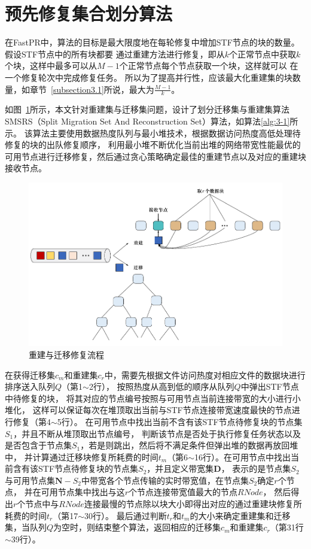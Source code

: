 \section{预先修复集合划分算法}
在FastPR\cite{shen2019fast}中，算法的目标是最大限度地在每轮修复中增加STF节点的块的数量。假设STF节点中的所有块都要
通过重建方法进行修复，即从$k$个正常节点中获取$k$个块，这样中最多可以从$M-1$个正常节点每个节点获取一个块，这样就可以
在一个修复轮次中完成修复任务。
所以为了提高并行性，应该最大化重建集的块数量，如章节~\ref{subsection3.1}所说，最大为$\frac{M-1}{k}$。

如图~\ref{fig:3.3}所示，本文针对重建集与迁移集问题，设计了划分迁移集与重建集算法SMSRS（Split Migration Set And Reconstruction Set）算法，如算法\ref{alg:3-1}所示。
该算法主要使用数据热度队列与最小堆技术，根据数据访问热度高低处理待修复的块的出队修复顺序，
利用最小堆不断优化当前出堆的网络带宽性能最优的可用节点进行迁移修复，然后通过贪心策略确定最佳的重建节点以及对应的重建块接收节点。

\begin{figure}[htbp]
	\centering
	\includegraphics [scale=0.9]{figures/3.3.pdf}
	\caption{重建与迁移修复流程}
	\label{fig:3.3}
\end{figure}

在获得迁移集$c_m$和重建集$c_r$中，需要先根据文件访问热度对相应文件的数据块进行排序送入队列$Q$（第1$\sim$2行），
按照热度从高到低的顺序从队列$Q$中弹出STF节点中待修复的块，
将其对应的节点编号按照与可用节点当前连接带宽的大小进行小堆化，
这样可以保证每次在堆顶取出当前与STF节点连接带宽速度最快的节点进行修复（第4$\sim$5行）。
在可用节点中找出当前不含有该STF节点待修复块的节点集$S_1$，并且不断从堆顶取出节点编号，
判断该节点是否处于执行修复任务状态以及是否包含于节点集$S_1$，若是则跳出，然后将不满足条件但弹出堆的数据再放回堆中，
并计算通过迁移块修复所耗费的时间$t_m$（第6$\sim$16行）。在可用节点中找出当前含有该STF节点待修复块的节点集$S_2$，并且定义带宽集$\textbf{D}$，
表示的是节点集$S_2$与可用节点集$\textbf{N}-S_2$中带宽各个节点传输的实时带宽值，在节点集$S_2$确定$r$个节点，
并在可用节点集中找出与这$r$个节点连接带宽值最大的节点$RNode$，
然后得出$r$个节点中与$RNode$连接最慢的节点除以块大小即得出对应的通过重建块修复所耗费的时间$t_r$（第17$\sim$30行）。
最后通过判断$t_r$和$t_m$的大小来确定重建集和迁移集，当队列$Q$为空时，则结束整个算法，返回相应的迁移集$c_m$和重建集$c_r$（第31行$\sim$39行）。



